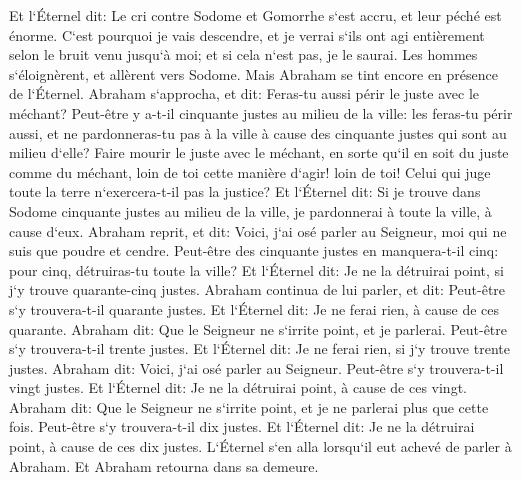 \verse Et l`Éternel dit: Le cri contre Sodome et Gomorrhe s`est accru, et leur péché est énorme. 
\verse C`est pourquoi je vais descendre, et je verrai s`ils ont agi entièrement selon le bruit venu jusqu`à moi; et si cela n`est pas, je le saurai. 
\verse Les hommes s`éloignèrent, et allèrent vers Sodome. Mais Abraham se tint encore en présence de l`Éternel. 
\verse Abraham s`approcha, et dit: Feras-tu aussi périr le juste avec le méchant? 
\verse Peut-être y a-t-il cinquante justes au milieu de la ville: les feras-tu périr aussi, et ne pardonneras-tu pas à la ville à cause des cinquante justes qui sont au milieu d`elle? 
\verse Faire mourir le juste avec le méchant, en sorte qu`il en soit du juste comme du méchant, loin de toi cette manière d`agir! loin de toi! Celui qui juge toute la terre n`exercera-t-il pas la justice? 
\verse Et l`Éternel dit: Si je trouve dans Sodome cinquante justes au milieu de la ville, je pardonnerai à toute la ville, à cause d`eux. 
\verse Abraham reprit, et dit: Voici, j`ai osé parler au Seigneur, moi qui ne suis que poudre et cendre. 
\verse Peut-être des cinquante justes en manquera-t-il cinq: pour cinq, détruiras-tu toute la ville? Et l`Éternel dit: Je ne la détruirai point, si j`y trouve quarante-cinq justes. 
\verse Abraham continua de lui parler, et dit: Peut-être s`y trouvera-t-il quarante justes. Et l`Éternel dit: Je ne ferai rien, à cause de ces quarante. 
\verse Abraham dit: Que le Seigneur ne s`irrite point, et je parlerai. Peut-être s`y trouvera-t-il trente justes. Et l`Éternel dit: Je ne ferai rien, si j`y trouve trente justes. 
\verse Abraham dit: Voici, j`ai osé parler au Seigneur. Peut-être s`y trouvera-t-il vingt justes. Et l`Éternel dit: Je ne la détruirai point, à cause de ces vingt. 
\verse Abraham dit: Que le Seigneur ne s`irrite point, et je ne parlerai plus que cette fois. Peut-être s`y trouvera-t-il dix justes. Et l`Éternel dit: Je ne la détruirai point, à cause de ces dix justes. 
\verse L`Éternel s`en alla lorsqu`il eut achevé de parler à Abraham. Et Abraham retourna dans sa demeure. 


